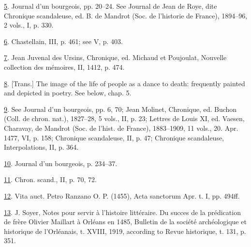 \protect\hypertarget{23_NOTES.xhtmlux5cux23id_2221}{\protect\hyperlink{08_Chapter_One__THE_PASSIONATE_INTE.xhtmlux5cux23id_2220}{5}}.
Journal d'un bourgeois, pp. 20--24. See Journal de Jean de Roye, dite
Chronique scandaleuse, ed. B. de Mandrot (Soc. de l'historie de France),
1894--96, 2 vols., I, p. 330.

\protect\hypertarget{23_NOTES.xhtmlux5cux23id_2219}{\protect\hyperlink{08_Chapter_One__THE_PASSIONATE_INTE.xhtmlux5cux23id_2218}{6}}.
Chastellain, III, p. 461; see V, p. 403.

\protect\hypertarget{23_NOTES.xhtmlux5cux23id_2217}{\protect\hyperlink{08_Chapter_One__THE_PASSIONATE_INTE.xhtmlux5cux23id_2216}{7}}.
Jean Juvenal des Ursins, Chronique, ed. Michaud et Poujoulat, Nouvelle
collection des mémoires, II, 1412, p. 474.

\protect\hypertarget{23_NOTES.xhtmlux5cux23id_2215}{\protect\hyperlink{08_Chapter_One__THE_PASSIONATE_INTE.xhtmlux5cux23id_2214}{8}}.
{[}Trans.{]} The image of the life of people as a dance to death:
frequently painted and depicted in poetry. See below, chap. 5.

\protect\hypertarget{23_NOTES.xhtmlux5cux23id_2213}{\protect\hyperlink{08_Chapter_One__THE_PASSIONATE_INTE.xhtmlux5cux23id_2212}{9}}.
See Journal d'un bourgeois, pp. 6, 70; Jean Molinet, Chronique, ed.
Buchon (Coll. de chron. nat.), 1827--28, 5 vols., II, p. 23; Lettres de
Louis XI, ed. Vaesen, Charavay, de Mandrot (Soc. de l'hist. de France),
1883--1909, 11 vols., 20. Apr. 1477, VI, p. 158; Chronique scandaleuse,
II, p. 47; Chronique scandaleuse, Interpolations, II, p. 364.

\protect\hypertarget{23_NOTES.xhtmlux5cux23id_2211}{\protect\hyperlink{08_Chapter_One__THE_PASSIONATE_INTE.xhtmlux5cux23id_2210}{10}}.
Journal d'un bourgeois, p. 234--37.

\protect\hypertarget{23_NOTES.xhtmlux5cux23id_2209}{\protect\hyperlink{08_Chapter_One__THE_PASSIONATE_INTE.xhtmlux5cux23id_2208}{11}}.
Chron. scand., II, p. 70, 72.

\protect\hypertarget{23_NOTES.xhtmlux5cux23id_2207}{\protect\hyperlink{08_Chapter_One__THE_PASSIONATE_INTE.xhtmlux5cux23id_2206}{12}}.
Vita auct. Petro Ranzano O. P. (1455), Acta sanctorum Apr. t. I, pp.
494ff.

\protect\hypertarget{23_NOTES.xhtmlux5cux23id_2205}{\protect\hyperlink{08_Chapter_One__THE_PASSIONATE_INTE.xhtmlux5cux23id_2204}{13}}.
J. Soyer, Notes pour servir à l'histoire littéraire. Du succes de la
prédication de frère Olivier Maillart à Orléans en 1485, Bulletin de la
société archéologique et historique de l'Orléanais, t. XVIII, 1919,
according to Revue historique, t. 131, p. 351.

